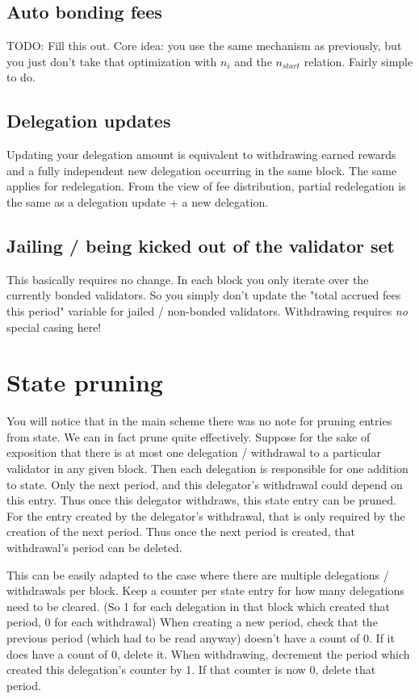 \documentclass[]{article}
\begin{document}
\subsection{Auto bonding fees}
TODO: Fill this out. 
Core idea: you use the same mechanism as previously, but you just don't take that optimization with $n_{i}$ and the $n_{start}$ relation.
Fairly simple to do.

\subsection{Delegation updates}
Updating your delegation amount is equivalent to withdrawing earned rewards and a fully independent new delegation occurring in the same block.
The same applies for redelegation.
From the view of fee distribution, partial redelegation is the same as a delegation update + a new delegation.

\subsection{Jailing / being kicked out of the validator set}
This basically requires no change.
In each block you only iterate over the currently bonded validators.
So you simply don't update the "total accrued fees this period" variable for jailed / non-bonded validators.
Withdrawing requires \textit{no} special casing here!

\section{State pruning}
You will notice that in the main scheme there was no note for pruning entries from state.
We can in fact prune quite effectively.
Suppose for the sake of exposition that there is at most one delegation / withdrawal to a particular validator in any given block.
Then each delegation is responsible for one addition to state.
Only the next period, and this delegator's withdrawal could depend on this entry. Thus once this delegator withdraws, this state entry can be pruned.
For the entry created by the delegator's withdrawal, that is only required by the creation of the next period.
Thus once the next period is created, that withdrawal's period can be deleted.

This can be easily adapted to the case where there are multiple delegations / withdrawals per block.
Keep a counter per state entry for how many delegations need to be cleared.
(So 1 for each delegation in that block which created that period, 0 for each withdrawal)
When creating a new period, check that the previous period (which had to be read anyway) doesn't have a count of 0.
If it does have a count of 0, delete it.
When withdrawing, decrement the period which created this delegation's counter by 1.
If that counter is now 0, delete that period.
\end{document}
